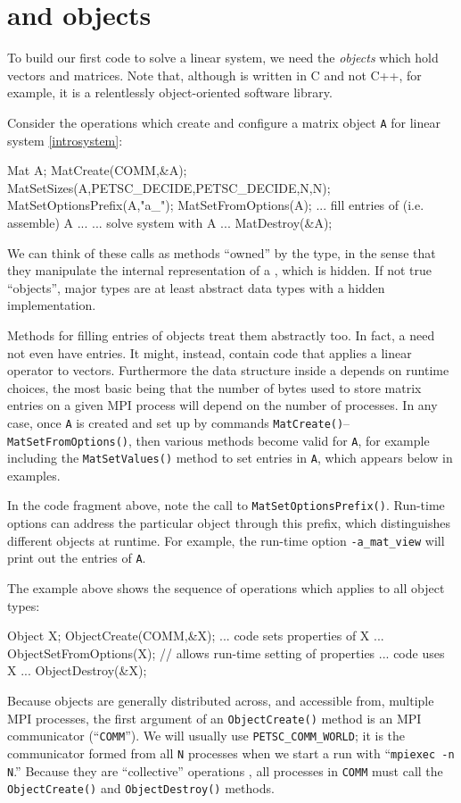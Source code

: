 \section{\PETSc \pVec and \pMat objects}

To build our first \PETSc code to solve a linear system, we need the \emph{objects} which hold vectors and matrices.  Note that, although \PETSc is written in C and not C++, for example, it is a relentlessly object-oriented software library.

Consider the operations which create and configure a matrix object \texttt{A} for linear system \eqref{introsystem}:
\begin{code}
Mat A;
MatCreate(COMM,&A);
MatSetSizes(A,PETSC_DECIDE,PETSC_DECIDE,N,N);
MatSetOptionsPrefix(A,"a_");
MatSetFromOptions(A);
... fill entries of (i.e. assemble) A ...
... solve system with A ...
MatDestroy(&A);
\end{code}
We can think of these calls as methods ``owned'' by the \pMat type, in the sense that they manipulate the internal representation of a \pMat, which is hidden.  If not true ``objects'', major \PETSc types are at least abstract data types with a hidden implementation.

Methods for filling entries of \pMat objects treat them abstractly too.  In fact, a \pMat need not even have entries.  It might, instead, contain code that applies a linear operator to vectors.  Furthermore the data structure inside a \pMat depends on runtime choices, the most basic being that the number of bytes used to store matrix entries on a given MPI process will depend on the number of processes.  In any case, once \pMat \texttt{A} is created and set up by commands \texttt{MatCreate()}--\texttt{MatSetFromOptions()}, then various methods become valid for \texttt{A}, for example including the \texttt{MatSetValues()} method to set entries in \texttt{A}, which appears below in examples.

In the code fragment above, note the call to \texttt{MatSetOptionsPrefix()}.  Run-time options can address the particular \pMat object through this prefix, which distinguishes different \pMat objects at runtime.  For example, the run-time option \texttt{-a\_mat\_view} will print out the entries of \texttt{A}.
 
The \pMat example above shows the sequence of operations which applies to all \PETSc object types:
\begin{code}
Object X;
ObjectCreate(COMM,&X);
... code sets properties of X ...
ObjectSetFromOptions(X);  // allows run-time setting of properties
... code uses X ...
ObjectDestroy(&X);
\end{code}
Because \PETSc objects are generally distributed across, and accessible from, multiple MPI processes, the first argument of an \texttt{ObjectCreate()} method is an MPI communicator (``\texttt{COMM}'').  We will usually use \texttt{PETSC\_COMM\_WORLD}; it is the communicator formed from all \texttt{N} processes when we start a run with ``\texttt{mpiexec -n N}.''  Because they are ``collective'' operations \citep{Groppetal1999}, all processes in \texttt{COMM} must call the \texttt{ObjectCreate()} and  \texttt{ObjectDestroy()} methods.


